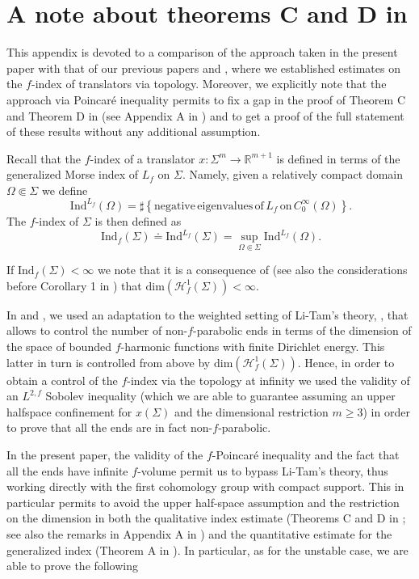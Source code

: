 \documentclass[11pt, leqno]{amsart}
\begin{document}

\appendix
\section{A note about theorems C and D in \cite{ImperaRimoldi_Transl}}

This appendix is devoted to a comparison of the approach taken in the present paper with that of our previous papers \cite{ImperaRimoldi_Transl} and \cite{IR_MathZ}, where we established estimates on the $f$-index of translators via topology. Moreover, we explicitly note that the approach via Poincar\'e inequality permits to fix a gap in the proof of Theorem C and Theorem D in \cite{ImperaRimoldi_Transl} (see Appendix A in \cite{IR_MathZ}) and to get a proof of the full statement of these results without any additional assumption.

Recall that the $f$-index of a translator $x:\Sigma^{m}\to\mathbb{R}^{m+1}$ is defined in terms of the generalized Morse index of $L_{f}$ on $\Sigma$. Namely, given a relatively compact domain $\Omega\Subset\Sigma$ we define
\[
\ \mathrm{Ind}^{L_{f}}(\Omega)=\sharp\left\{\mathrm{negative\,eigenvalues\,of\,}L_{f}\,\mathrm{on\,} C_{0}^{\infty}(\Omega)\right\}.
\]
The $f$-index of $\Sigma$ is then defined as
\[
\ \mathrm{Ind}_{f}(\Sigma)\doteq\mathrm{Ind}^{L_{f}}(\Sigma)=\sup_{\Omega\Subset\Sigma}\mathrm{Ind}^{L_{f}}(\Omega).
\]

If $\mathrm{Ind}_{f}(\Sigma)<\infty$ we note that it is a consequence of \cite[Theorem 3]{IR_fMin} (see also the considerations before Corollary 1 in \cite{IR_fMin}) that $\mathrm{dim}\left(\mathcal{H}^{1}_{f}(\Sigma)\right)<\infty$.

In \cite{ImperaRimoldi_Transl} and \cite{IR_MathZ}, we used an adaptation to the weighted setting of Li-Tam's theory, \cite{LiTam}, that allows to control the number of non-$f$-parabolic ends in terms of the dimension of the space of bounded $f$-harmonic functions with finite Dirichlet energy. This latter in turn is controlled from above by $\mathrm{dim}(\mathcal{H}^{1}_{f}(\Sigma))$. Hence, in order to obtain a control of the $f$-index via the topology at infinity we used the validity of an $L^{2,f}$ Sobolev inequality (which we are able to guarantee assuming an upper halfspace confinement for $x(\Sigma)$ and the dimensional restriction $m\geq 3$)  in order to prove that all the ends are in fact non-$f$-parabolic. 
\medskip

In the present paper, the validity of the $f$-Poincar\'e inequality and the fact that all the ends have infinite $f$-volume permit us to bypass Li-Tam's theory, thus working directly with the first cohomology group with compact support. This in particular permits to avoid the upper half-space assumption and the restriction on the dimension in both the qualitative index estimate (Theorems C and D in \cite{ImperaRimoldi_Transl}; see also the remarks in Appendix A in \cite{IR_MathZ}) and the quantitative estimate for the generalized index (Theorem A in \cite{IR_MathZ}). In particular, as for the unstable case, we are able to prove the following
\end{document}

